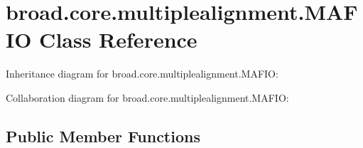 \hypertarget{classbroad_1_1core_1_1multiplealignment_1_1_m_a_f_i_o}{\section{broad.\+core.\+multiplealignment.\+M\+A\+F\+I\+O Class Reference}
\label{classbroad_1_1core_1_1multiplealignment_1_1_m_a_f_i_o}
}


Inheritance diagram for broad.\+core.\+multiplealignment.\+M\+A\+F\+I\+O\+:


Collaboration diagram for broad.\+core.\+multiplealignment.\+M\+A\+F\+I\+O\+:
\subsection*{Public Member Functions}
